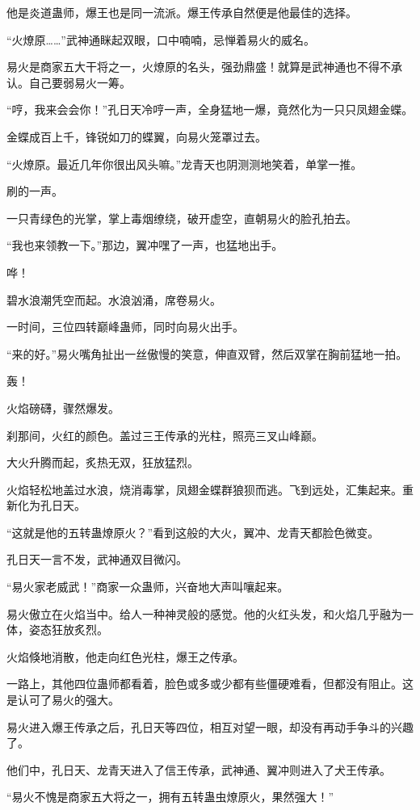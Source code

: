 \begin{this_body}
他是炎道蛊师，爆王也是同一流派。爆王传承自然便是他最佳的选择。

“火燎原……”武神通眯起双眼，口中喃喃，忌惮着易火的威名。

易火是商家五大干将之一，火燎原的名头，强劲鼎盛！就算是武神通也不得不承认。自己要弱易火一筹。

“哼，我来会会你！”孔日天冷哼一声，全身猛地一爆，竟然化为一只只凤翅金蝶。

金蝶成百上千，锋锐如刀的蝶翼，向易火笼罩过去。

“火燎原。最近几年你很出风头嘛。”龙青天也阴测测地笑着，单掌一推。

刷的一声。

一只青绿色的光掌，掌上毒烟缭绕，破开虚空，直朝易火的脸孔拍去。

“我也来领教一下。”那边，翼冲嘿了一声，也猛地出手。

哗！

碧水浪潮凭空而起。水浪汹涌，席卷易火。

一时间，三位四转巅峰蛊师，同时向易火出手。

“来的好。”易火嘴角扯出一丝傲慢的笑意，伸直双臂，然后双掌在胸前猛地一拍。

轰！

火焰磅礴，骤然爆发。

刹那间，火红的颜色。盖过三王传承的光柱，照亮三叉山峰巅。

大火升腾而起，炙热无双，狂放猛烈。

火焰轻松地盖过水浪，烧消毒掌，凤翅金蝶群狼狈而逃。飞到远处，汇集起来。重新化为孔日天。

“这就是他的五转蛊燎原火？”看到这般的大火，翼冲、龙青天都脸色微变。

孔日天一言不发，武神通双目微闪。

“易火家老威武！”商家一众蛊师，兴奋地大声叫嚷起来。

易火傲立在火焰当中。给人一种神灵般的感觉。他的火红头发，和火焰几乎融为一体，姿态狂放炙烈。

火焰倏地消散，他走向红色光柱，爆王之传承。

一路上，其他四位蛊师都看着，脸色或多或少都有些僵硬难看，但都没有阻止。这是认可了易火的强大。

易火进入爆王传承之后，孔日天等四位，相互对望一眼，却没有再动手争斗的兴趣了。

他们中，孔日天、龙青天进入了信王传承，武神通、翼冲则进入了犬王传承。

“易火不愧是商家五大将之一，拥有五转蛊虫燎原火，果然强大！”


\end{this_body}
